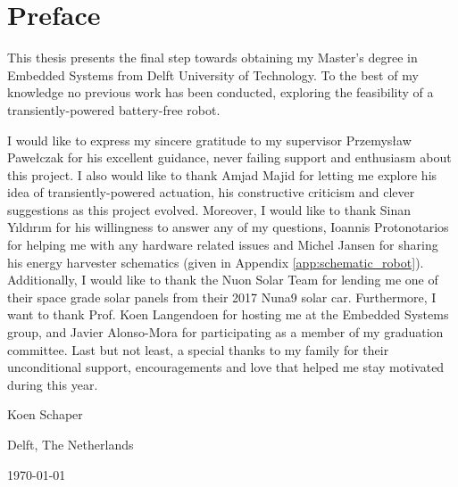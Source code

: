 \chapter*{Preface}

This thesis presents the final step towards obtaining my Master's degree in Embedded Systems from Delft University of Technology.
To the best of my knowledge no previous work has been conducted, exploring the feasibility of a transiently-powered battery-free robot. 


\vspace{1\baselineskip}

\noindent
I would like to express my sincere gratitude to my supervisor Przemys\l{}aw Pawe\l{}czak for his excellent guidance, never failing support and enthusiasm about this project. 
I also would like to thank Amjad Majid for letting me explore his idea of transiently-powered actuation, his constructive criticism and clever suggestions as this project evolved.
Moreover, I would like to thank Sinan Y{\i}ld{\i}r{\i}m for his willingness to answer any of my questions, Ioannis Protonotarios for helping me with any hardware related issues and Michel Jansen for sharing his energy harvester schematics (given in Appendix \ref{app:schematic_robot}).
Additionally, I would like to thank the Nuon Solar Team for lending me one of their space grade solar panels from their 2017 Nuna9 solar car.
Furthermore, I want to thank Prof. Koen Langendoen for hosting me at the Embedded Systems group, and Javier Alonso-Mora for participating as a member of my graduation committee.
Last but not least, a special thanks to my family for their unconditional support, encouragements and love that helped me stay motivated during this year.

\vspace{1\baselineskip}

\noindent
Koen Schaper

\vspace{1\baselineskip}

\noindent
Delft, The Netherlands

\noindent
\today

